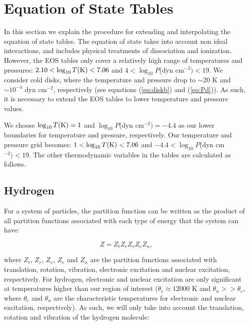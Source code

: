 \documentclass[apj]{emulateapj}
\begin{document}
\appendix
\section{Equation of State Tables}\label{EOStables}

In this section we explain the procedure for extending and interpolating the \cite{saumon95} equation of state tables. The equation of state takes into account non ideal interactions, and includes physical treatments of dissociation and ionization. However, the \cite{saumon95} EOS tables only cover a relatively high range of temperatures and pressures: $2.10 < \log_{10} T(\rm{K})<7.06$ and $4<\log_{10}P$(dyn cm$^{-2})<19$. We consider cold disks, where the temperature and pressure drop to $\sim 20$ K and $\sim 10^{-4}$ dyn cm$^{-2}$, respectively (see equations (\ref{eq:diskb}) and (\ref{eq:Pd})). As such, it is necessary to extend the \cite{saumon95} EOS tables to lower temperature and pressure values.

We choose $\log_{10} T (\rm{K})=1$ and $ \log_{10}P$(dyn cm$^{-2})=-4.4$ as our lower boundaries for temperature and pressure, respectively. Our temperature and pressure grid becomes: $1 < \log_{10} T(\rm{K})<7.06$ and $-4.4<\log_{10}P$(dyn cm$^{-2})<19$. The other thermodynamic variables in the tables are calculated as follows.

\subsection{Hydrogen}

\label{hydrogen}

For a system of particles, the partition function can be written as the product of all partition functions associated with each type of energy that the system can have:

\begin{equation}
\label{eq:z}
Z=Z_t Z_r Z_v Z_e Z_n,
\end{equation}

\noindent where $Z_t$, $Z_r$, $Z_v$, $Z_e$ and $Z_n$ are the partition functions associated with translation, rotation, vibration, electronic excitation and nuclear excitation, respectively. For hydrogen, electronic and nuclear excitation are only significant at temperatures higher than our region of interest ($\theta_e \approx 12000$ K and $\theta_n >> \theta_e$, where $\theta_e$ and $\theta_n$ are the characteristic temperatures for electronic and nuclear excitation, respectively). As such, we will only take into account the translation, rotation and vibration of the hydrogen molecule:
\end{document}
